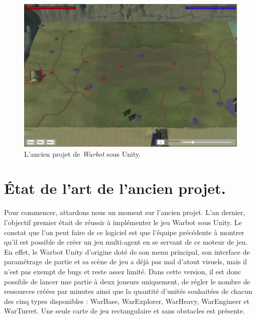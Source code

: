\documentclass{report}
\begin{document}
\begin{figure}[h]
\centering
\includegraphics[scale=0.375]{OldWarbotUnityImage}
\caption{L'ancien projet de \textit{Warbot} sous Unity.}
\end{figure}

\section{État de l'art de l'ancien projet.}
 
Pour commencer, attardons nous un moment sur l'ancien projet. L'an dernier, l'objectif premier était de réussir à implémenter le jeu Warbot sous Unity. Le constat que l'on peut faire de ce logiciel est que l'équipe précédente à montrer qu'il est possible de créer un jeu multi-agent en se servant de ce moteur de jeu.
En effet, le Warbot Unity d'origine doté de son menu principal, son interface de paramétrage de partie et sa scène de jeu a déjà pas mal d'atout visuels, mais il n'est pas exempt de bugs et reste assez limité.
Dans cette version, il est donc possible de lancer une partie à deux joueurs uniquement, de régler le nombre de ressources créées par minutes ainsi que la quantité d'unités souhaitées de chacun des cinq types disponibles : WarBase, WarExplorer, WarHeavy, WarEngineer et WarTurret. Une seule carte de jeu rectangulaire et sans obstacles est présente. 
\end{document}
